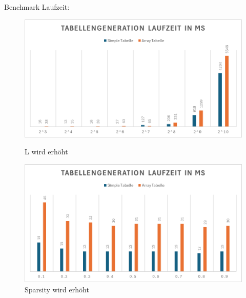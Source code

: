 \documentclass[11pt]{scrartcl}
\begin{document}
Benchmark Laufzeit:
\begin{figure}[H]
  \begin{minipage}[b]{.4\linewidth}
    \begin{center}
      \includegraphics[width=\linewidth]{laufzeit_l.png}
      \caption{L wird erhöht} 
    \end{center}
  \end{minipage}
  \hspace{.1\linewidth}
  \begin{minipage}[b]{.4\linewidth}
    \begin{center}
      \includegraphics[width=\linewidth]{laufzeit_spar.png}
      \caption{Sparsity wird erhöht}
    \end{center}
  \end{minipage}      
\end{figure}
\end{document}
